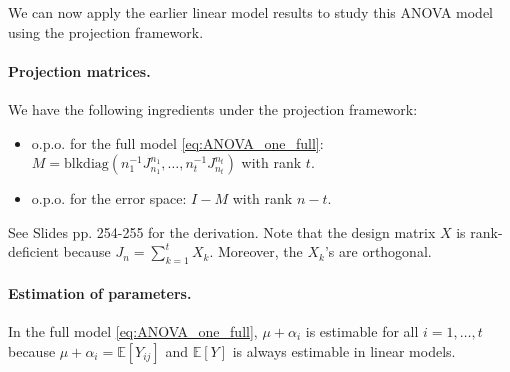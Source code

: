 \documentclass{article}
\theoremstyle{break}
\newcommand{\R}{\ensuremath{\mathbb{R}}}
\newcommand{\E}{\ensuremath{\mathbb{E}}}
\begin{document}
We can now apply the earlier linear model results to study this ANOVA model using the projection framework.


\paragraph{Projection matrices.}
We have the following ingredients under the projection framework:
\begin{itemize}
    \item o.p.o. for the full model \eqref{eq:ANOVA_one_full}: $M = \text{blkdiag}(n_1^{-1} J_{n_1}^{n_1}, \ldots, n_t^{-1} J_{n_t}^{n_t})$ with rank $t$.
    \item o.p.o. for the error space: $I-M$ with rank $n-t$.
\end{itemize}

See Slides pp. 254-255 for the derivation.
Note that the design matrix $X$ is rank-deficient because $J_n = \sum_{k=1}^t X_k$. Moreover, the $X_k$'s are orthogonal.



\paragraph{Estimation of parameters.}
In the full model \eqref{eq:ANOVA_one_full}, $\mu+\alpha_i$ is estimable for all $i=1, \ldots, t$ because $\mu + \alpha_i = \E[Y_{ij}]$ and $\E[Y]$ is always estimable in linear models.
\end{document}
